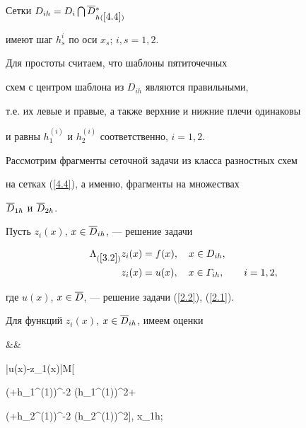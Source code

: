 Сетки $D_{ih}=D_i\bigcap \overline{D}{}^{*}_{h(\ref{4.4})}$


имеют шаг $h^i_s$ по оси $x_s$; $i,s=1,2$.


Для простоты считаем, что шаблоны пятиточечных


схем с центром шаблона из $D_{ih}$ являются правильными,


т.е. их левые и правые, а также верхние и нижние плечи одинаковы


и равны $h_1^{(i)}$ и $h_2^{(i)}$ соответственно, $i=1,2$.





Рассмотрим фрагменты сеточной задачи из класса разностных схем


на сетках (\ref{4.4}), а именно, фрагменты на множествах


$\overline{D}_{1h}$ и $\overline{D}_{2h}$.


Пусть $z_i(x)$, $x\in \overline{D}_{ih}$, --- решение задачи


\begin{equation} \label{4.5}


\begin{split}


\La_{(\ref{3.2})} z_i(x) &= f(x), \quad 


x\in D_{ih}, \\


z_i(x)&=u(x), \quad x\in \G_{ih}, \qquad


i=1,2,


\end{split}


\end{equation}


где $u(x)$, $x\in\overline{D}$, --- решение задачи (\ref{2.2}), (\ref{2.1}).





Для функций $z_i(x)$, $x\in \overline{D}_{ih}$, имеем оценки


\beqs \label{4.6}


\beq




&& \label{4.6a} \hspace*{-1cm}


|u(x)-z_1(x)|\le M[


(\eps+h_1^{(1)})^{-2} (h_1^{(1)})^2+


(\eps+h_2^{(1)})^{-2} (h_2^{(1)})^2], \quad x\in \Db_{1h}; \\[1.5ex]


